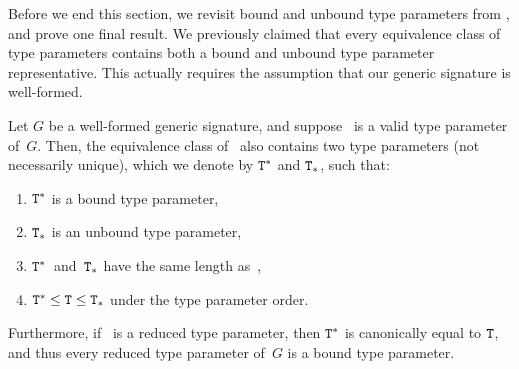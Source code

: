\documentclass[../generics]{subfiles}
\begin{document}
Before we end this section, we revisit bound and unbound type parameters from , and prove one final result. We previously claimed that every equivalence class of type parameters contains both a bound and unbound type parameter representative. This actually requires the assumption that our generic signature is well-formed.
\begin{theorem}\label{bound and unbound equiv}
Let $G$ be a well-formed generic signature, and suppose \tT\ is a valid type parameter of~$G$. Then, the equivalence class of \tT\ also contains two type parameters (not necessarily unique), which we denote by $\texttt{T}^*$ and $\texttt{T}_*$, such that:
\begin{enumerate}
\item $\texttt{T}^*$ is a bound type parameter,
\item $\texttt{T}_*$ is an unbound type parameter,
\item $\texttt{T}^*$~and~$\texttt{T}_*$ have the same length as~\tT,
\item $\texttt{T}^*\le\texttt{T}\le\texttt{T}_*$ under the type parameter order.
\end{enumerate}
Furthermore, if \tT\ is a reduced type parameter, then $\texttt{T}^*$ is canonically equal to $\texttt{T}$, and thus every reduced type parameter of~$G$ is a bound type parameter.
\end{theorem}
\end{document}
